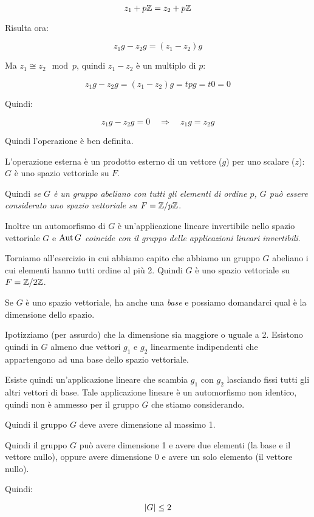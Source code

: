 \begin{soluzione}
	\begin{equation}
		z_1 + p\mathbb{Z} = z_2 + p\mathbb{Z}
	\end{equation}

	Risulta ora:
	
	\begin{equation}
		z_1g - z_2g = (z_1 - z_2)g
	\end{equation}

	Ma $z_1 \cong z_2 \mod p$, quindi $z_1 - z_2$ è un multiplo di $p$:
	
	\begin{equation}
		z_1g - z_2g = (z_1 - z_2)g = tpg = t0 = 0
	\end{equation}

	Quindi:
	
	\begin{equation}
		z_1g - z_2g = 0 \quad\Longrightarrow\quad z_1g = z_2g
	\end{equation}

	Quindi l'operazione è ben definita.
	
	L'operazione esterna è un prodotto esterno di un vettore ($g$) per uno scalare ($z$): $G$ è uno spazio vettoriale su $F$.
	
	Quindi \emph{se $G$ è un gruppo abeliano con tutti gli elementi di ordine $p$, $G$ può essere considerato uno spazio vettoriale su $F = \mathbb{Z}/p\mathbb{Z}$}.
	
	Inoltre un automorfismo di $G$ è un'applicazione lineare invertibile nello spazio vettoriale $G$ e \emph{$\operatorname{Aut} G$ coincide con il gruppo delle applicazioni lineari invertibili}.
	
	Torniamo all'esercizio in cui abbiamo capito che abbiamo un gruppo $G$ abeliano i cui elementi hanno tutti ordine al più 2. Quindi $G$ è uno spazio vettoriale su $F = \mathbb{Z}/2\mathbb{Z}$.
	
	Se $G$ è uno spazio vettoriale, ha anche una \emph{base} e possiamo domandarci qual è la dimensione dello spazio.
	
	Ipotizziamo (per assurdo) che la dimensione sia maggiore o uguale a 2. Esistono quindi in $G$ almeno due vettori $g_1$ e $g_2$ linearmente indipendenti che appartengono ad una base dello spazio vettoriale.
	
	Esiste quindi un'applicazione lineare che scambia $g_1$ con $g_2$ lasciando fissi tutti gli altri vettori di base. Tale applicazione lineare è un automorfismo non identico, quindi non è ammesso per il gruppo $G$ che stiamo considerando.
	
	Quindi il gruppo $G$ deve avere dimensione al massimo 1.
	
	Quindi il gruppo $G$ può avere dimensione 1 e avere due elementi (la base e il vettore nullo), oppure avere dimensione 0 e avere un solo elemento (il vettore nullo).
	
	Quindi:
	
	\begin{equation}
		\lvert G \rvert \le 2
	\end{equation}
	
\end{soluzione}

